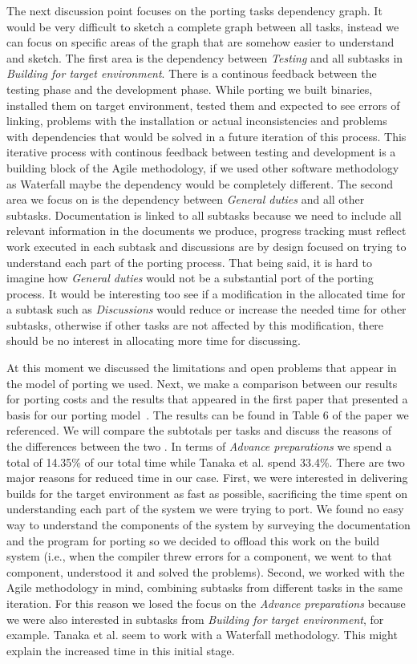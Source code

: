 The next discussion point focuses on the porting tasks dependency graph. It
would be very difficult to sketch a complete graph between all tasks, instead we
can focus on specific areas of the graph that are somehow easier to understand
and sketch. The first area is the dependency between \textit{Testing} and all
subtasks in \textit{Building for target environment}. There is a continous
feedback between the testing phase and the development phase. While porting we
built binaries, installed them on target environment, tested them and expected
to see errors of linking, problems with the installation or actual
inconsistencies and problems with dependencies that would be solved in a future
iteration of this process. This iterative process with continous feedback
between testing and development is a building block of the Agile methodology, if
we used other software methodology as Waterfall maybe the dependency would be
completely different. The second area we focus on is the dependency between
\textit{General duties} and all other subtasks. Documentation is linked to all
subtasks because we need to include all relevant information in the documents we
produce, progress tracking must reflect work executed in each subtask and
discussions are by design focused on trying to understand each part of the
porting process. That being said, it is hard to imagine how \textit{General
duties} would not be a substantial port of the porting process. It would be
interesting too see if a modification in the allocated time for a subtask such
as \textit{Discussions} would reduce or increase the needed time for other
subtasks, otherwise if other tasks are not affected by this modification, there
should be no interest in allocating more time for discussing.

At this moment we discussed the limitations and open problems that appear in the
model of porting we used. Next, we make a comparison between our results for
porting costs and the results that appeared in the first paper that presented a
basis for our porting model~\cite{b1}. The results can be found in Table 6 of
the paper we referenced. We will compare the subtotals per tasks and discuss the
reasons of the differences between the two . In terms of \textit{Advance
preparations} we spend a total of 14.35\% of our total time while Tanaka et al.
spend 33.4\%.  There are two major reasons for reduced time in our case. First,
we were interested in delivering builds for the target environment as fast as
possible, sacrificing the time spent on understanding each part of the system we
were trying to port. We found no easy way to understand the components of the
system by surveying the documentation and the program for porting so we decided
to offload this work on the build system (i.e., when the compiler threw errors
for a component, we went to that component, understood it and solved the
problems). Second, we worked with the Agile methodology in mind, combining
subtasks from different tasks in the same iteration. For this reason we
losed the focus on the \textit{Advance preparations} because we were also
interested in subtasks from \textit{Building for target environment}, for
example. Tanaka et al. seem to work with a Waterfall methodology. This might
explain the increased time in this initial stage.

